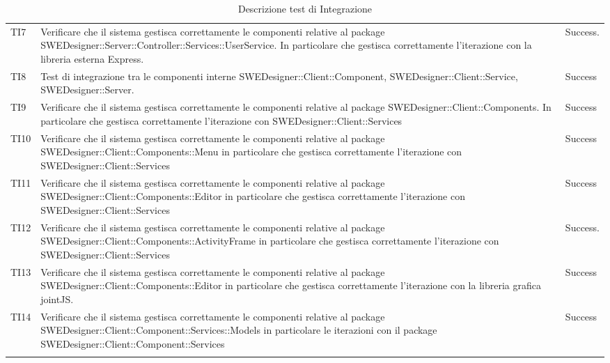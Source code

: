 \begin{longtable}{p{2cm}!{\VRule[1pt]}p{9.5cm}!{\VRule[1pt]}p{1.5cm}}
TI7 & Verificare che il sistema gestisca correttamente le componenti relative al package SWEDesigner::Server::Controller::Services::UserService. In particolare che gestisca correttamente l'iterazione con la libreria esterna Express. & Success.\\

TI8 & Test di integrazione tra le componenti interne SWEDesigner::Client::Component, SWEDesigner::Client::Service, SWEDesigner::Server. & Success\\

TI9 & Verificare che il sistema gestisca correttamente le componenti relative al package SWEDesigner::Client::Components. In particolare che gestisca correttamente l’iterazione con SWEDesigner::Client::Services & Success\\

TI10 & Verificare che il sistema gestisca correttamente le componenti relative al package SWEDesigner::Client::Components::Menu in particolare che gestisca correttamente l'iterazione con SWEDesigner::Client::Services & Success\\

TI11 & Verificare che il sistema gestisca correttamente le componenti relative al package SWEDesigner::Client::Components::Editor in particolare che gestisca correttamente l'iterazione con SWEDesigner::Client::Services & Success\\

TI12 & Verificare che il sistema gestisca correttamente le componenti relative al package SWEDesigner::Client::Components::ActivityFrame in particolare che gestisca correttamente l'iterazione con SWEDesigner::Client::Services & Success.\\

TI13 & Verificare che il sistema gestisca correttamente le componenti relative al package SWEDesigner::Client::Components::Editor in particolare che gestisca correttamente l'iterazione con la libreria grafica jointJS. & Success\\

TI14 & Verificare che il sistema gestisca correttamente le componenti relative al package SWEDesigner::Client::Component::Services::Models in particolare le iterazioni con il  package SWEDesigner::Client::Component::Services & Success\\

\caption{Descrizione test di Integrazione}
\end{longtable}

